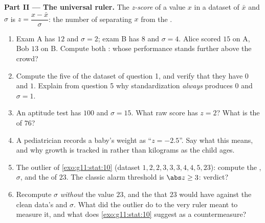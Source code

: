 \begin{problem}
\medskip
\noindent\textbf{Part II --- The universal ruler.}
The \emph{z-score} of a value $x$ in a dataset of
 $\bar x$ and  $\sigma$ is
$z = \dfrac{x - \bar x}{\sigma}$: the number of  separating $x$ from the .
\begin{enumerate}[resume]
  \item Exam A has  $12$ and $\sigma = 2$; exam B has 
        $8$ and $\sigma = 4$. Alice scored $15$ on A, Bob $13$
        on B. Compute both : whose performance stands
        further above the crowd?
  \item Compute the five  of the dataset of question 1,
        and verify that they have  $0$ and  $1$. Explain from question 5 why
        standardization \emph{always} produces  $0$ and
        $\sigma = 1$.
  \item An aptitude test has  $100$ and $\sigma = 15$. What
        raw score has $z = 2$? What is the  of $76$?
  \item A pediatrician records a baby's weight as
        ``$z = -2.5$''. Say what this means, and why growth is
        tracked in  rather than kilograms as the child
        ages.
  \item The outlier of \cref{exo:g11:stat:10} (dataset
        $1, 2, 2, 3, 3, 3, 4, 4, 5, 23$): compute the ,
        $\sigma$, and the  of $23$. The classic alarm
        threshold is $\abs z \geq 3$: verdict?
  \item Recompute $\sigma$ \emph{without} the value $23$, and
        the  that $23$ would have against the clean
        data's  and $\sigma$. What did the outlier do to
        the very ruler meant to measure it, and what does
        \cref{exo:g11:stat:10} suggest as a countermeasure?
\end{enumerate}


\end{problem}
